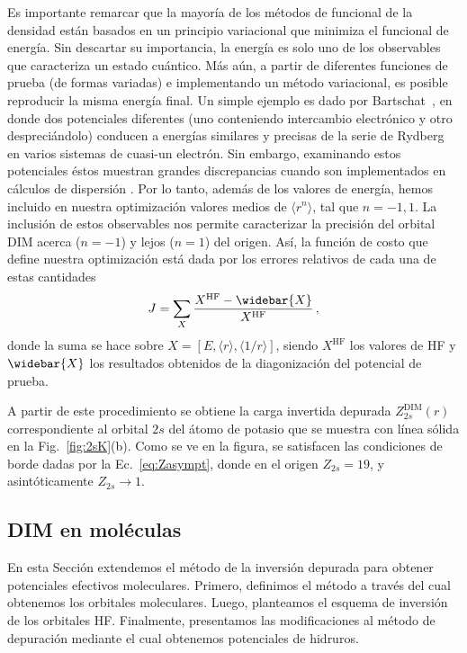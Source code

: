 Es importante remarcar que la mayoría de los métodos de funcional de la 
densidad están basados en un principio variacional que minimiza el 
funcional de energía. Sin descartar su importancia, la energía es solo
uno de los observables que caracteriza un estado cuántico. Más aún, a 
partir de diferentes funciones de prueba (de formas variadas) e 
implementando un método variacional, es posible reproducir la misma 
energía final. Un simple ejemplo es dado por 
Bartschat~\cite{Albright:93,Bartschat:96}, en donde dos potenciales
diferentes (uno conteniendo intercambio electrónico y otro 
despreciándolo) conducen a energías similares y precisas de la serie de 
Rydberg en varios sistemas de cuasi-un electrón. Sin embargo, examinando 
estos potenciales éstos muestran grandes discrepancias cuando son 
implementados en cálculos de dispersión \cite{BartschatBray:96}. Por lo 
tanto, además de los valores de energía, hemos incluido en nuestra 
optimización valores medios de $\langle r^{n} \rangle$, tal que 
$n=-1,1$. La inclusión de estos observables nos permite caracterizar la 
precisión del orbital DIM acerca ($n=-1$) y lejos ($n=1$) del origen. 
Así, la función de costo que define nuestra optimización está dada por 
los errores relativos de cada una de estas cantidades
\begin{equation}
J=\sum_X \frac{X^{\mathrm{HF}}-\widebar{X}}{X^{\mathrm{HF}}}\,,
\label{eq:fncosto-dim}
\end{equation}
donde la suma se hace sobre 
$X=\left[E,\langle r \rangle,\langle 1/r \rangle\right]$, siendo 
$X^{\mathrm{HF}}$ los valores de HF y $\widebar{X}$ los resultados 
obtenidos de la diagonización del potencial de prueba. 

A partir de este procedimiento se obtiene la carga invertida depurada 
$Z_{2s}^{\mathrm{DIM}}(r)$ correspondiente al orbital $2s$ del átomo 
de potasio que se muestra con línea sólida en la Fig.~\ref{fig:2sK}(b).
Como se ve en la figura, se satisfacen las condiciones de borde dadas 
por la Ec.~\ref{eq:Zasympt}, donde en el origen $Z_{2s} = 19$, y 
asintóticamente $Z_{2s} \rightarrow 1$.

\subsection{DIM en moléculas}
\label{sec:dimmoleculas}

En esta Sección extendemos el método de la inversión depurada para 
obtener potenciales efectivos moleculares. Primero, definimos el método 
a través del cual obtenemos los orbitales moleculares. Luego, planteamos 
el esquema de inversión de los orbitales HF. Finalmente, presentamos las 
modificaciones al método de depuración mediante el cual obtenemos 
potenciales de hidruros.

